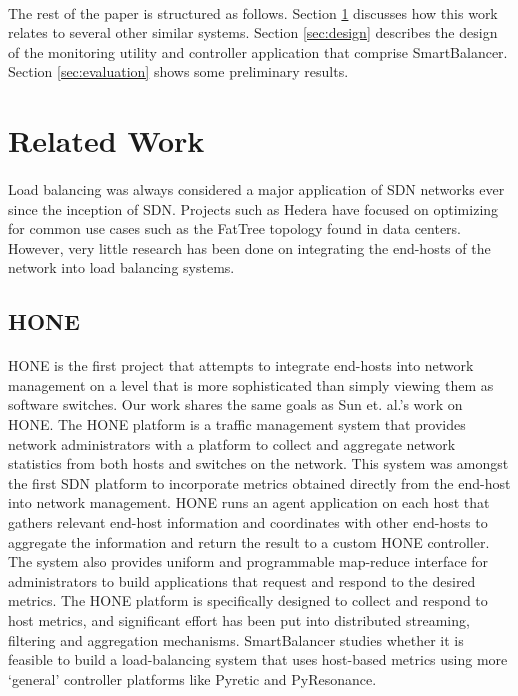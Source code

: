 \documentclass[10pt]{article}
\begin{document}
\paragraph{} The rest of the paper is structured as follows. Section \ref{sec:related} discusses how this work relates to several other similar systems. Section \ref{sec:design} describes the design of the monitoring utility and controller application that comprise SmartBalancer. Section \ref{sec:evaluation} shows some preliminary results.

\section{Related Work}
\label{sec:related}

\paragraph{} Load balancing was always considered a major application of SDN networks ever since the inception of SDN. Projects such as Hedera \cite{Hedera} have focused on optimizing for common use cases such as the FatTree topology found in data centers. However, very little research has been done on integrating the end-hosts of the network into load balancing systems.



\subsection{HONE}

\paragraph{} HONE\cite{HONE} is the first project that attempts to integrate end-hosts into network management on a level that is more sophisticated than simply viewing them as software switches. Our work shares the same goals as Sun et. al.’s work on HONE. The HONE platform is a traffic management system that provides network administrators with a platform to collect and aggregate network statistics from both hosts and switches on the network. This system was amongst the first SDN platform to incorporate metrics obtained directly from the end-host into network management. HONE runs an agent application on each host that gathers relevant end-host information and coordinates with other end-hosts to aggregate the information and return the result to a custom HONE controller. The system also provides uniform and programmable map-reduce interface for administrators to build applications that request and respond to the desired metrics. The HONE platform is specifically designed to collect and respond to host metrics, and significant effort has been put into distributed streaming, filtering and aggregation mechanisms. SmartBalancer studies whether it is feasible to build a load-balancing system that uses host-based metrics using more ‘general’ controller platforms like Pyretic\cite{Pyretic} and PyResonance\cite{PyResonance}.
\end{document}
